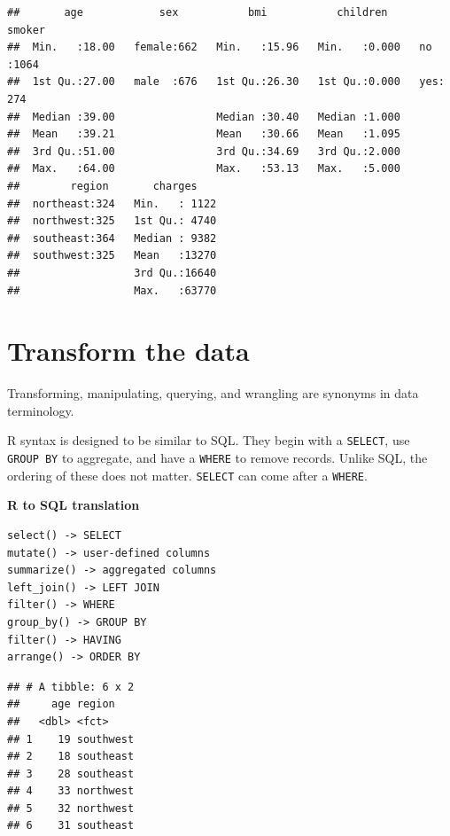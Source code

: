 \documentclass[openany]{book}
\newenvironment{Shaded}{\begin{snugshade}}{\end{snugshade}}
\newcommand{\KeywordTok}[1]{\textcolor[rgb]{0.13,0.29,0.53}{\textbf{#1}}}
\newcommand{\NormalTok}[1]{#1}
\newcommand{\OperatorTok}[1]{\textcolor[rgb]{0.81,0.36,0.00}{\textbf{#1}}}
\newcommand{\StringTok}[1]{\textcolor[rgb]{0.31,0.60,0.02}{#1}}
\begin{document}
\begin{verbatim}
##       age            sex           bmi           children     smoker    
##  Min.   :18.00   female:662   Min.   :15.96   Min.   :0.000   no :1064  
##  1st Qu.:27.00   male  :676   1st Qu.:26.30   1st Qu.:0.000   yes: 274  
##  Median :39.00                Median :30.40   Median :1.000             
##  Mean   :39.21                Mean   :30.66   Mean   :1.095             
##  3rd Qu.:51.00                3rd Qu.:34.69   3rd Qu.:2.000             
##  Max.   :64.00                Max.   :53.13   Max.   :5.000             
##        region       charges     
##  northeast:324   Min.   : 1122  
##  northwest:325   1st Qu.: 4740  
##  southeast:364   Median : 9382  
##  southwest:325   Mean   :13270  
##                  3rd Qu.:16640  
##                  Max.   :63770
\end{verbatim}

\hypertarget{transform-the-data}{%
\section{Transform the data}\label{transform-the-data}}

Transforming, manipulating, querying, and wrangling are synonyms in data terminology.

R syntax is designed to be similar to SQL. They begin with a \texttt{SELECT}, use \texttt{GROUP\ BY} to aggregate, and have a \texttt{WHERE} to remove records. Unlike SQL, the ordering of these does not matter. \texttt{SELECT} can come after a \texttt{WHERE}.

\textbf{R to SQL translation}

\begin{verbatim}
select() -> SELECT
mutate() -> user-defined columns
summarize() -> aggregated columns
left_join() -> LEFT JOIN
filter() -> WHERE
group_by() -> GROUP BY
filter() -> HAVING
arrange() -> ORDER BY
\end{verbatim}

\begin{Shaded}
\end{Shaded}

\begin{verbatim}
## # A tibble: 6 x 2
##     age region   
##   <dbl> <fct>    
## 1    19 southwest
## 2    18 southeast
## 3    28 southeast
## 4    33 northwest
## 5    32 northwest
## 6    31 southeast
\end{verbatim}
\end{document}
